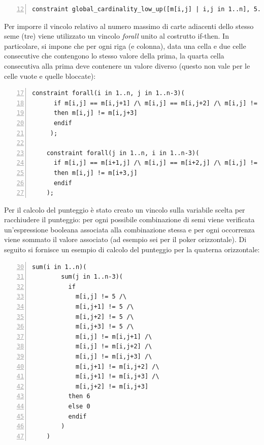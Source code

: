 \documentclass[12pt]{article}
\begin{document}
    \begin{Verbatim}[numbers=left,firstnumber=12,frame=lines,framesep=3mm,label={verb:blocked\_cardinality},breaklines=true]
    constraint global_cardinality_low_up([m[i,j] | i,j in 1..n], 5..5, [0 | k in 5..5], [blocked | k in 5..5]);
    \end{Verbatim}


    Per imporre il vincolo relativo al numero massimo di carte adiacenti dello stesso seme (tre) viene utilizzato un vincolo \textit{forall} unito al costrutto if-then.
    In particolare, si impone che per ogni riga (e colonna), data una cella e due celle consecutive che contengono lo stesso valore della prima, la quarta cella consecutiva alla prima deve contenere un valore diverso (questo non vale per le celle vuote e quelle bloccate):

    \begin{Verbatim}[numbers=left,firstnumber=17,frame=lines,framesep=3mm,label={verb:four\_different},breaklines=true]
    constraint forall(i in 1..n, j in 1..n-3)(
      if m[i,j] == m[i,j+1] /\ m[i,j] == m[i,j+2] /\ m[i,j] != 5
      then m[i,j] != m[i,j+3]
      endif
     );

    constraint forall(j in 1..n, i in 1..n-3)(
      if m[i,j] == m[i+1,j] /\ m[i,j] == m[i+2,j] /\ m[i,j] != 5
      then m[i,j] != m[i+3,j]
      endif
    );
    \end{Verbatim}

    Per il calcolo del punteggio è stato creato un vincolo sulla variabile scelta per racchiudere il punteggio: per ogni possibile combinazione di semi viene verificata un'espressione booleana associata alla combinazione stessa e per ogni occorrenza viene sommato il valore associato (ad esempio sei per il poker orizzontale).
    Di seguito si fornisce un esempio di calcolo del punteggio per la quaterna orizzontale:

    \begin{Verbatim}[numbers=left,firstnumber=30,frame=lines,framesep=3mm,label={verb:horiz\_four},breaklines=true]
    sum(i in 1..n)(
        sum(j in 1..n-3)(
          if
            m[i,j] != 5 /\
            m[i,j+1] != 5 /\
            m[i,j+2] != 5 /\
            m[i,j+3] != 5 /\
            m[i,j] != m[i,j+1] /\
            m[i,j] != m[i,j+2] /\
            m[i,j] != m[i,j+3] /\
            m[i,j+1] != m[i,j+2] /\
            m[i,j+1] != m[i,j+3] /\
            m[i,j+2] != m[i,j+3]
          then 6
          else 0
          endif
        )
    )
    \end{Verbatim}
\end{document}
